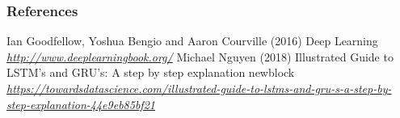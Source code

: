 \begin{vbframe}
\frametitle{References}
\footnotesize{
\begin{thebibliography}{99}
 Ian Goodfellow, Yoshua Bengio and Aaron Courville (2016)
\newblock Deep Learning
\newblock \emph{\url{http://www.deeplearningbook.org/}}
 Michael Nguyen (2018)
\newblock Illustrated Guide to LSTM's and GRU's: A step by step explanation
newblock \emph{\url{https://towardsdatascience.com/illustrated-guide-to-lstms-and-gru-s-a-step-by-step-explanation-44e9eb85bf21}}
\end{thebibliography}
}
\end{vbframe}

\endlecture
